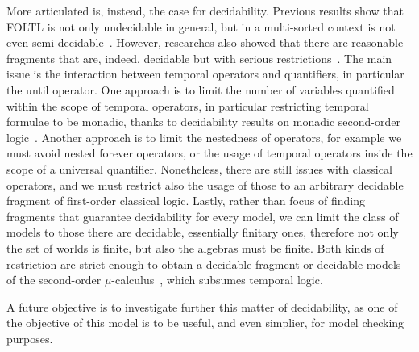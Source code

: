 More articulated is, instead, the case for decidability. Previous results show that \ac{FOLTL} is not only undecidable
in general, but in a multi-sorted context is not even semi-decidable~\cite{merz_decidability_1992}. However, researches
also showed that there are reasonable fragments that are, indeed, decidable but with serious
restrictions~\cite{hodkinson_decidable_2000,hodkinson_decidable_2002,goos_monodic_2001,peyras_decidable_2020,peyras_bounded_2019}.
The main issue is the interaction between temporal operators and quantifiers, in particular the until operator. One
approach is to limit the number of variables quantified within the scope of temporal operators, in particular
restricting temporal formulae to be monadic, thanks to decidability results on monadic second-order
logic~\cite{rozenberg_expression_1997}. Another approach is to limit the nestedness of operators, for example we must
avoid nested forever operators, or the usage of temporal operators inside the scope of a universal quantifier.
Nonetheless, there are still issues with classical operators, and we must restrict also the usage of those to an
arbitrary decidable fragment of first-order classical logic. Lastly, rather than focus of finding fragments that
guarantee decidability for every model, we can limit the class of models to those there are decidable, essentially
finitary ones, therefore not only the set of worlds is finite, but also the algebras must be finite. Both kinds of
restriction are strict enough to obtain a decidable fragment or decidable models of the second-order
$\mu$-calculus~\cite{hutchison_counterpart_2010}, which subsumes temporal logic.

A future objective is to investigate further this matter of decidability, as one of the objective of this model is to be
useful, and even simplier, for model checking purposes.
